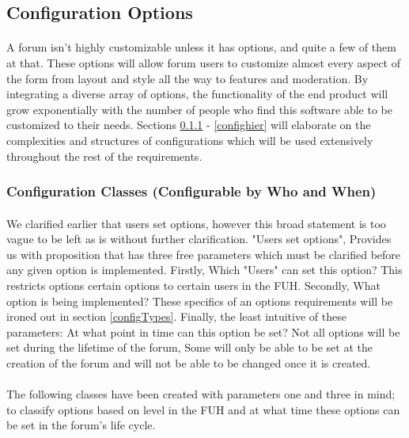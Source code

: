 \documentclass[]{article}
\begin{document}
\subsection{Configuration Options}
\paragraph{}
A forum isn't highly customizable unless it has options, and quite a few of them at that. These options will allow forum users to customize almost every aspect of the form from layout and style all the way to features and moderation. By integrating a diverse array of options, the functionality of the end product will grow exponentially with the number of people who find this software able to be customized to their needs. Sections \ref{configclass} - \ref{confighier} will elaborate on the complexities and structures of configurations which will be used extensively throughout the rest of the requirements. 

\subsubsection{Configuration Classes (Configurable by Who and When)}\label{configclass}
\paragraph{}
We clarified earlier that users set options, however this broad statement is too vague to be left as is without further clarification. "Users set options", Provides us with proposition that has three free parameters which must be clarified before any given option is implemented. Firstly, Which "Users" can set this option? This restricts options certain options to certain users in the FUH. Secondly, What option is being implemented? These specifics of an options requirements will be ironed out in section \ref{configTypes}. Finally, the least intuitive of these parameters: At what point in time can this option be set? Not all options will be set during the lifetime of the forum, Some will only be able to be set at the creation of the forum and will not be able to be changed once it is created. 
\paragraph{}
The following classes have been created with parameters one and three in mind; to classify options based on level in the FUH and at what time these options can be set in the forum's life cycle.
\end{document}
